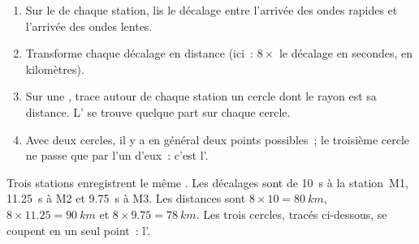 \begin{method}\label{met:g7:earthquakes:three-circles}
\begin{enumerate}
  \item Sur le  de chaque station, lis le décalage entre
        l'arrivée des ondes rapides et l'arrivée des ondes lentes.
  \item Transforme chaque décalage en distance (ici~: $8 \times$ le
        décalage en secondes, en kilomètres).
  \item Sur une , trace autour de chaque station un cercle dont le
        rayon est sa distance. L' se trouve quelque part sur
        chaque cercle.
  \item Avec deux cercles, il y a en général deux points possibles~; le
        troisième cercle ne passe que par l'un d'eux~: c'est l'.
\end{enumerate}
\end{method}

\begin{example}\label{ex:g7:earthquakes:three-circles}
Trois stations enregistrent le même . Les décalages sont de
\qty{10}{s} à la station~M1, \qty{11.25}{s} à M2 et \qty{9.75}{s} à M3.
Les distances sont $8 \times 10 = \qty{80}{km}$, $8 \times 11.25 = \qty{90}{km}$ et
$8 \times 9.75 = \qty{78}{km}$. Les trois cercles, tracés ci-dessous, se
coupent en un seul point~: l'.
\end{example}

